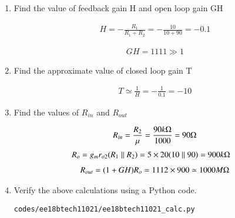 \begin{enumerate}[label=\thesection.\arabic*.,ref=\thesection.\theenumi]
\item
Find the value of feedback gain H and open loop gain GH

\solution
\begin{align}
    H=-\frac{R_{1}}{R_{1}+R_{2}}=-\frac{10}{10+90}=-0.1
\end{align}

\begin{align}
    GH=1111 \gg 1
\end{align}

\item
Find the approximate value of closed loop gain T

\solution
\begin{align}
    T \simeq \frac{1}{H} = -\frac{1}{0.1} = -10
\end{align}

\item
Find the values of $R_{in}$ and $R_{out}$

\solution
\begin{align}
    R_{in}=\frac{R_{2}}{\mu}=\frac{90k\ohm}{1000}=90\ohm
\end{align}
\begin{align}
    R_{o} &=g_{m} r_{o 2}(R_{1} \parallel R_{2}) =5 \times 20(10 \parallel 90)=900k\ohm
\end{align}
\begin{align}
    R_{out}=(1+GH) R_{o}=1112 \times 900 \simeq 1000M\ohm
\end{align}

\begin{table}[!ht]
\centering

\caption{}
\label{table: Output_Table}
\end{table}

\item
Verify the above calculations using a Python code.

\solution
\begin{lstlisting}
codes/ee18btech11021/ee18btech11021_calc.py
\end{lstlisting}

\end{enumerate}
